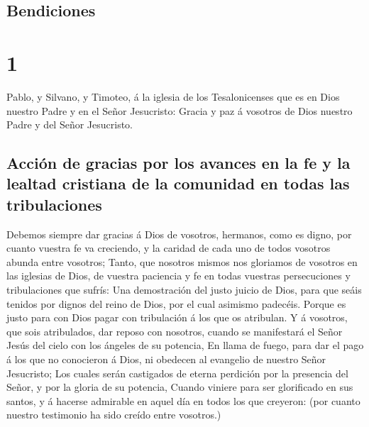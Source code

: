 \hypertarget{bendiciones}{%
\subsection{Bendiciones}\label{bendiciones}}

\hypertarget{section}{%
\section{1}\label{section}}

 Pablo, y Silvano, y Timoteo, á la iglesia de los
Tesalonicenses que es en Dios nuestro Padre y en el Señor Jesucristo:
 Gracia y paz á vosotros de Dios nuestro Padre y del Señor
Jesucristo.

\hypertarget{acciuxf3n-de-gracias-por-los-avances-en-la-fe-y-la-lealtad-cristiana-de-la-comunidad-en-todas-las-tribulaciones}{%
\subsection{Acción de gracias por los avances en la fe y la lealtad
cristiana de la comunidad en todas las
tribulaciones}\label{acciuxf3n-de-gracias-por-los-avances-en-la-fe-y-la-lealtad-cristiana-de-la-comunidad-en-todas-las-tribulaciones}}

 Debemos siempre dar gracias á Dios de vosotros, hermanos,
como es digno, por cuanto vuestra fe va creciendo, y la caridad de cada
uno de todos vosotros abunda entre vosotros;  Tanto, que
nosotros mismos nos gloriamos de vosotros en las iglesias de Dios, de
vuestra paciencia y fe en todas vuestras persecuciones y tribulaciones
que sufrís:  Una demostración del justo juicio de Dios,
para que seáis tenidos por dignos del reino de Dios, por el cual
asimismo padecéis.  Porque es justo para con Dios pagar
con tribulación á los que os atribulan.  Y á vosotros, que
sois atribulados, dar reposo con nosotros, cuando se manifestará el
Señor Jesús del cielo con los ángeles de su potencia,  En
llama de fuego, para dar el pago á los que no conocieron á Dios, ni
obedecen al evangelio de nuestro Señor Jesucristo;  Los
cuales serán castigados de eterna perdición por la presencia del Señor,
y por la gloria de su potencia,  Cuando viniere para ser
glorificado en sus santos, y á hacerse admirable en aquel día en todos
los que creyeron: (por cuanto nuestro testimonio ha sido creído entre
vosotros.)

